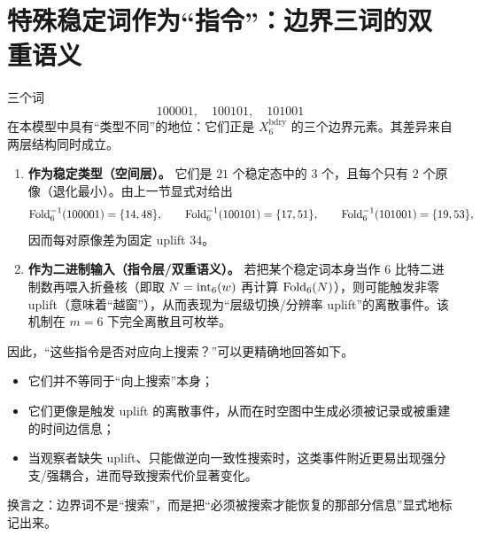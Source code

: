 
\section{特殊稳定词作为“指令”：边界三词的双重语义}

三个词
$$
100001,\quad 100101,\quad 101001
$$
在本模型中具有“类型不同”的地位：它们正是 $X_6^{\mathrm{bdry}}$ 的三个边界元素。其差异来自两层结构同时成立。
\begin{enumerate}
  \item \textbf{作为稳定类型（空间层）。} 它们是 $21$ 个稳定态中的 $3$ 个，且每个只有 $2$ 个原像（退化最小）。由上一节显式对给出
  $$
  \mathrm{Fold}_6^{-1}(100001)=\{14,48\},\qquad
  \mathrm{Fold}_6^{-1}(100101)=\{17,51\},\qquad
  \mathrm{Fold}_6^{-1}(101001)=\{19,53\},
  $$
  因而每对原像差为固定 uplift $34$。
  \item \textbf{作为二进制输入（指令层/双重语义）。} 若把某个稳定词本身当作 $6$ 比特二进制数再喂入折叠核（即取 $N=\mathrm{int}_6(w)$ 再计算 $\mathrm{Fold}_6(N)$），则可能触发非零 uplift（意味着“越窗”），从而表现为“层级切换/分辨率 uplift”的离散事件。该机制在 $m=6$ 下完全离散且可枚举。
\end{enumerate}

因此，“这些指令是否对应向上搜索？”可以更精确地回答如下。
\begin{itemize}
  \item 它们并不等同于“向上搜索”本身；
  \item 它们更像是触发 uplift 的离散事件，从而在时空图中生成必须被记录或被重建的时间边信息；
  \item 当观察者缺失 uplift、只能做逆向一致性搜索时，这类事件附近更易出现强分支/强耦合，进而导致搜索代价显著变化。
\end{itemize}

换言之：边界词不是“搜索”，而是把“必须被搜索才能恢复的那部分信息”显式地标记出来。

